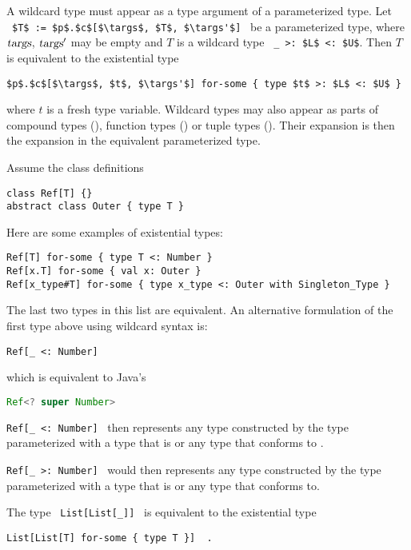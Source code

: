 A wildcard type must appear as a type argument of a parameterized type. Let ~\lstinline!$T$ := $p$.$c$[$\targs$, $T$, $\targs'$]!~ be a parameterized type, where $\mbox{\sl targs}$, $\mbox{\sl targs}'$ may be empty and $T$ is a wildcard type ~\lstinline!_ >: $L$ <: $U$!. Then $T$ is equivalent to the existential type
\begin{lstlisting}
$p$.$c$[$\targs$, $t$, $\targs'$] for-some { type $t$ >: $L$ <: $U$ }
\end{lstlisting}
where $t$ is a fresh type variable. Wildcard types may also appear as parts of compound types (), function types () or tuple types (). Their expansion is then the expansion in the equivalent parameterized type. 

\example Assume the class definitions
\begin{lstlisting}
class Ref[T] {}
abstract class Outer { type T }
\end{lstlisting}

Here are some examples of existential types:
\begin{lstlisting}
Ref[T] for-some { type T <: Number }
Ref[x.T] for-some { val x: Outer }
Ref[x_type#T] for-some { type x_type <: Outer with Singleton_Type }
\end{lstlisting}

The last two types in this list are equivalent. An alternative formulation of the first type above using wildcard syntax is:
\begin{lstlisting}
Ref[_ <: Number]
\end{lstlisting}

which is equivalent to Java's
\begin{lstlisting}[language=Java]
Ref<? super Number>
\end{lstlisting}

\lstinline!Ref[_ <: Number]!~ then represents any type constructed by the type parameterized with a type that is  or any type that conforms to . 

\lstinline!Ref[_ >: Number]!~ would then represents any type constructed by the type  parameterized with a type that is  or any type that  conforms to. 

\example The type ~\lstinline!List[List[_]]!~ is equivalent to the existential type
\begin{lstlisting}
List[List[T] for-some { type T }]  .
\end{lstlisting}

